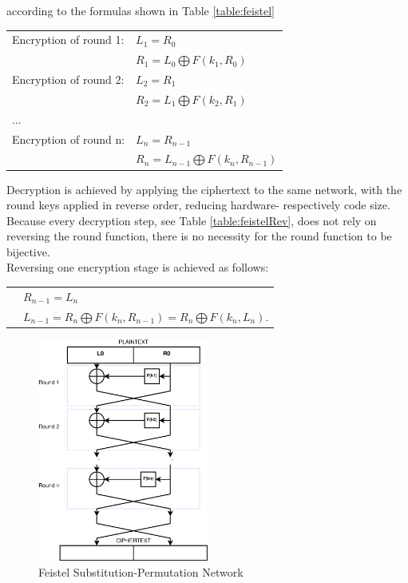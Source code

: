 according to the formulas shown in Table \ref{table:feistel}
\\
\begin{center}
\begin{tabular}{ l l}
 \label{table:feistel}
  Encryption of round 1: & $L_1 = R_0$  \\ 
   &  $R_1 = L_0 \bigoplus F(k_1, R_0)$\\ \hline
  Encryption of round 2: & $L_{2} = R_1$  \\
   &  $R_{2} = L_1 \bigoplus F(k_2, R_1)$ \\ \hline
   ... &  \\ \hline
   Encryption of round n: & $L_{n} = R_{n-1}$ \\
   & $R_n = L_{n-1} \bigoplus F(k_n, R_{n-1})$ \\
\end{tabular}
\end{center}
Decryption is achieved by applying the ciphertext to the same network, with the round keys applied in reverse order, reducing hardware- respectively
code size. Because every decryption step, see Table \ref{table:feistelRev}, does not rely on reversing the round function, there is no necessity for the round function to be bijective.
\\
Reversing one encryption stage is achieved as follows:
\begin{center}
\begin{tabular}{ l l}
 \label{table:feistelRev}
 & $R_{n-1} = L_n$  \\
 & $L_{n-1} = R_n \bigoplus F(k_n, R_{n-1}) = R_n \bigoplus F(k_n, L_{n}) $.
\end{tabular}
\end{center}

\begin{figure}
    \centering
    \includegraphics[width=0.5\textwidth]{figures/feistel.eps}
    \caption{Feistel Substitution-Permutation Network}
    \label{fig:feistel}
\end{figure}

